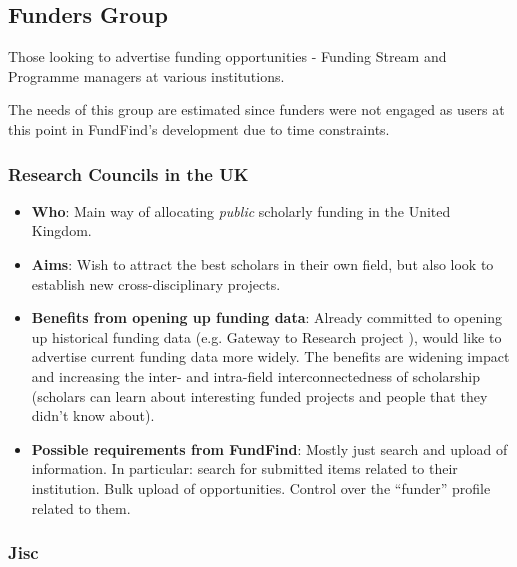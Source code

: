 \subsection{Funders Group}
Those looking to advertise funding opportunities - Funding Stream and Programme managers at various institutions.

The needs of this group are estimated since funders were not engaged as users at this point in FundFind's development due to time constraints.

\subsubsection{Research Councils in the UK}

\begin{itemize}
 \item \textbf{Who}: Main way of allocating \emph{public} scholarly funding in the United Kingdom.
 \item \textbf{Aims}: Wish to attract the best scholars in their own field, but also look to establish new cross-disciplinary  projects.
 \item \textbf{Benefits from opening up funding data}: Already committed to opening up historical funding data (e.g. Gateway to Research project \cite{rcuk-on-gtr}), would like to advertise current funding data more widely. The benefits are widening impact and increasing the inter- and intra-field interconnectedness of scholarship (scholars can learn about interesting funded projects and people that they didn't know about).
 \item \textbf{Possible requirements from FundFind}: Mostly just search and upload of information. In particular: search for submitted items related to their institution. Bulk upload of opportunities. Control over the ``funder'' profile related to them.
\end{itemize}

\subsubsection{Jisc}

